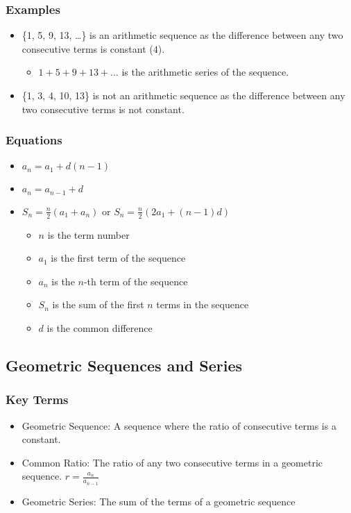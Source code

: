 \documentclass[12pt]{article}
\begin{document}
\subsubsection{Examples}
\begin{itemize}
    \item \{1, 5, 9, 13, \dots\} is an arithmetic sequence as the difference between any two consecutive terms is constant ($4$).
    \begin{itemize}
        \item $1 + 5 + 9 + 13 + \dots$ is the arithmetic series of the sequence.
    \end{itemize}
    \item \{1, 3, 4, 10, 13\} is not an arithmetic sequence as the difference between any two consecutive terms is not constant.
\end{itemize}
\subsubsection{Equations}
\begin{itemize}
    \item $a_n = a_1 + d(n-1)$
    \item $a_n = a_{n-1} + d$
    \item $S_n = \frac{n}{2}(a_1 + a_n)$ or $S_n = \frac{n}{2}(2a_1 + (n-1)d)$
    \begin{itemize}
        \item $n$ is the term number
        \item $a_1$ is the first term of the sequence
        \item $a_n$ is the $n$-th term of the sequence
        \item $S_n$ is the sum of the first $n$ terms in the sequence
        \item $d$ is the common difference
    \end{itemize}
\end{itemize}
\subsection{Geometric Sequences and Series}
\subsubsection{Key Terms}
\begin{itemize}
    \item Geometric Sequence: A sequence where the ratio of consecutive terms is a constant.
    \item Common Ratio: The ratio of any two consecutive terms in a geometric sequence. $r = \frac{a_n}{a_{n-1}}$
    \item Geometric Series: The sum of the terms of a geometric sequence
\end{itemize}
\end{document}
